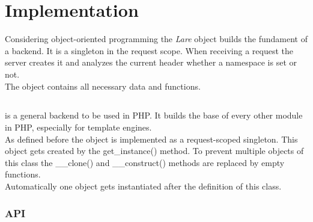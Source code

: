 \section{Implementation}

Considering object-oriented programming the \emph{Lare} object builds the fundament of a \lare{} backend.
It is a singleton in the request scope.
When receiving a request the server creates it and analyzes the current \http{} header whether a namespace is set or not.
\\
The \lare{} object contains all necessary data and functions.


\subsection{\phpLare{}}
\phpLare{} is a general \lare{} backend to be used in PHP.
It builds the base of every other \lare{} module in PHP, especially for template engines.
\\
As defined before the \lare{} object is implemented as a request-scoped singleton.
This object gets created by the get\_instance() method.
To prevent multiple objects of this class the \_\_clone() and  \_\_construct() methods are replaced by empty functions.
\\
Automatically one object gets instantiated after the definition of this class.


\subsubsection{API}

